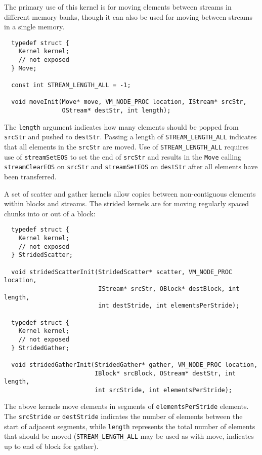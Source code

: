  The primary use of this kernel is for moving elements between streams in different memory banks, though it can also be used for moving between streams in a single memory. 
{\small \begin{verbatim}
  typedef struct {
    Kernel kernel;
    // not exposed
  } Move;
  
  const int STREAM_LENGTH_ALL = -1;
  
  void moveInit(Move* move, VM_NODE_PROC location, IStream* srcStr, 
                OStream* destStr, int length);
\end{verbatim}}

The {\tt length} argument indicates how many elements should be popped from {\tt srcStr} and pushed to {\tt destStr}. Passing a length of {\tt STREAM\_LENGTH\_ALL} indicates that all elements in the {\tt srcStr} are moved. Use of {\tt STREAM\_LENGTH\_ALL} requires use of {\tt streamSetEOS} to set the end of {\tt srcStr} and results in the {\tt Move} calling {\tt streamClearEOS} on {\tt srcStr} and {\tt streamSetEOS} on {\tt destStr} after all elements have been transferred.

 A set of scatter and gather kernels allow copies between non-contiguous elements within blocks and streams.  The strided kernels are for moving regularly spaced chunks into or out of a block: 
{\small \begin{verbatim}
  typedef struct {
    Kernel kernel;
    // not exposed
  } StridedScatter;
  
  void stridedScatterInit(StridedScatter* scatter, VM_NODE_PROC location, 
                          IStream* srcStr, OBlock* destBlock, int length,
                          int destStride, int elementsPerStride);

  typedef struct {
    Kernel kernel;
    // not exposed
  } StridedGather;
  
  void stridedGatherInit(StridedGather* gather, VM_NODE_PROC location, 
                         IBlock* srcBlock, OStream* destStr, int length,
                         int srcStride, int elementsPerStride);
\end{verbatim}}

The above kernels move elements in segments of {\tt elementsPerStride} elements. The {\tt srcStride} or {\tt destStride} indicates the number of elements between the start of adjacent segments, while {\tt length} represents the total number of elements that should be moved ({\tt STREAM\_LENGTH\_ALL} may be used as with move, indicates up to end of block for gather).

